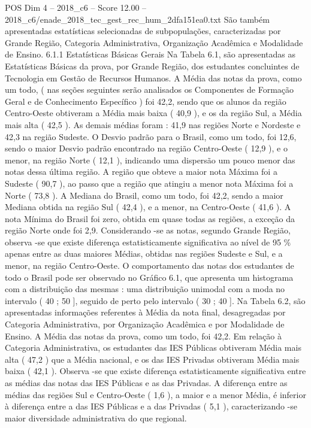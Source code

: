 \begin{textsample}{POS Dim 4 – 2018\_c6 – Score 12.00 – 2018\_c6/enade\_2018\_tec\_gest\_rec\_hum\_2dfa151ea0.txt}
São também apresentadas estatísticas selecionadas de subpopulações, caracterizadas por Grande Região, Categoria Administrativa, Organização Acadêmica e Modalidade de Ensino. 6.1.1 Estatísticas Básicas Gerais Na Tabela 6.1, são apresentadas as Estatísticas Básicas da prova, por Grande Região, dos estudantes concluintes de Tecnologia em Gestão de Recursos Humanos.
A Média das notas da prova, como um todo, ( nas seções seguintes serão analisados os Componentes de Formação Geral e de Conhecimento Específico ) foi 42,2, sendo que os alunos da região Centro-Oeste obtiveram a Média mais baixa ( 40,9 ), e os da região Sul, a Média mais alta ( 42,5 ).
As demais médias foram : 41,9 nas regiões Norte e Nordeste e 42,3 na região Sudeste.
O Desvio padrão para o Brasil, como um todo, foi 12,6, sendo o maior Desvio padrão encontrado na região Centro-Oeste ( 12,9 ), e o menor, na região Norte ( 12,1 ), indicando uma dispersão um pouco menor das notas dessa última região.
A região que obteve a maior nota Máxima foi a Sudeste ( 90,7 ), ao passo que a região que atingiu a menor nota Máxima foi a Norte ( 73,8 ).
A Mediana do Brasil, como um todo, foi 42,2, sendo a maior Mediana obtida na região Sul ( 42,4 ), e a menor, na Centro-Oeste ( 41,6 ).
A nota Mínima do Brasil foi zero, obtida em quase todas as regiões, a exceção da região Norte onde foi 2,9.
Considerando -se as notas, segundo Grande Região, observa -se que existe diferença estatisticamente significativa ao nível de 95 \% apenas entre as duas maiores Médias, obtidas nas regiões Sudeste e Sul, e a menor, na região Centro-Oeste.
O comportamento das notas dos estudantes de todo o Brasil pode ser observado no Gráfico 6.1, que apresenta um histograma com a distribuição das mesmas : uma distribuição unimodal com a moda no intervalo ( 40 ; 50 ], seguido de perto pelo intervalo ( 30 ; 40 ].
Na Tabela 6.2, são apresentadas informações referentes à Média da nota final, desagregadas por Categoria Administrativa, por Organização Acadêmica e por Modalidade de Ensino.
A Média das notas da prova, como um todo, foi 42,2.
Em relação à Categoria Administrativa, os estudantes das IES Públicas obtiveram Média mais alta ( 47,2 ) que a Média nacional, e os das IES Privadas obtiveram Média mais baixa ( 42,1 ).
Observa -se que existe diferença estatisticamente significativa entre as médias das notas das IES Públicas e as das Privadas.
A diferença entre as médias das regiões Sul e Centro-Oeste ( 1,6 ), a maior e a menor Média, é inferior à diferença entre a das IES Públicas e a das Privadas ( 5,1 ), caracterizando -se maior diversidade administrativa do que regional.

\end{textsample}
